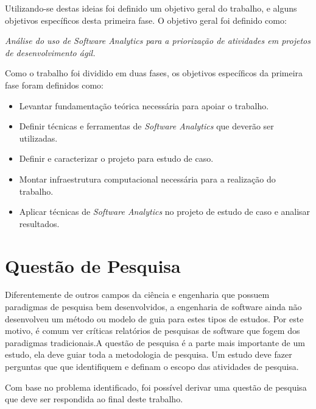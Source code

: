Utilizando-se destas ideias foi definido um objetivo geral do trabalho, e alguns
objetivos específicos desta primeira fase. O objetivo geral foi definido como:

\begin{center}
    \textit{Análise do uso de Software Analytics para a priorização
        de atividades em projetos de desenvolvimento ágil.}
\end{center}

Como o trabalho foi dividido em duas fases, os objetivos específicos da primeira
fase foram definidos como:

\begin{itemize}
    \item Levantar fundamentação teórica necessária para apoiar o trabalho.
    \item Definir técnicas e ferramentas de \textit{Software Analytics} que deverão ser utilizadas.
    \item Definir e caracterizar o projeto para estudo de caso.
    \item Montar infraestrutura computacional necessária para a realização do trabalho.
    \item Aplicar técnicas de \textit{Software Analytics} no projeto de estudo de caso e analisar resultados.
\end{itemize}

\section{Questão de Pesquisa}
\label{int:que}

Diferentemente de outros campos da ciência e engenharia que possuem paradigmas de
pesquisa bem desenvolvidos, a engenharia de software ainda não desenvolveu um
método ou modelo de guia para estes tipos de estudos. Por este motivo, é
comum ver críticas relatórios de pesquisas de software que fogem dos paradigmas
tradicionais\cite{shaw}.A questão de pesquisa é a parte mais importante de um estudo, ela deve guiar toda
a metodologia de pesquisa. Um estudo deve fazer perguntas que que identifiquem e
definam o escopo das atividades de pesquisa\cite{guidelines}.

Com base no problema identificado, foi possível derivar uma questão de pesquisa
que deve ser respondida ao final deste trabalho.


